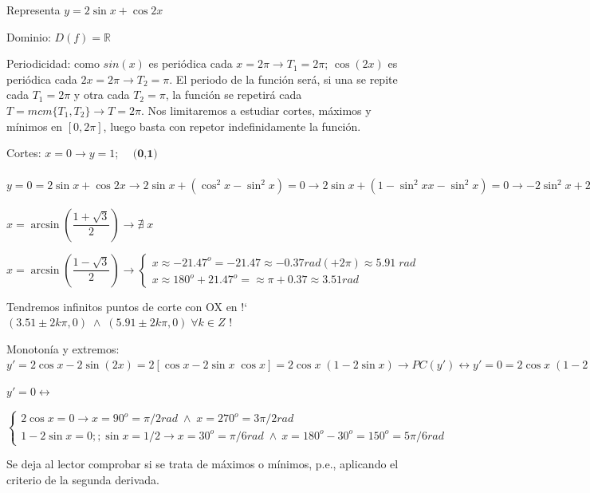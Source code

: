 \begin{ejre} Representa $y=2 \sin x + \cos 2x$
	
\end{ejre}

\begin{proofw}\renewcommand{\qedsymbol}{$\diamond$}	

Dominio: $D(f)=\mathbb R$

Periodicidad: como $sin (x)$ es periódica cada $x=2\pi \to T_1=2\pi$; $\cos(2x)$ es periódica cada $2x=2\pi \to T_2=\pi$. El periodo de la función será, si una se repite cada  $T_1=2\pi$ y otra cada $T_2=\pi$, la función se repetirá cada $T=mcm\{T_1, T_2\} \to T=2\pi$. Nos limitaremos a estudiar cortes, máximos y mínimos en $[0,2\pi]$, luego basta con repetor indefinidamente la función.

Cortes: $x=0 \to y=1$; $\quad \textbf{(0,1)}$

$y=0=2 \sin x + \cos 2x \to 2\sin x + (\cos^2 x-\sin^2 x)=0 \to  2\sin x + (1-\sin^2 x x-\sin^2 x)=0 \to -2\sin^2 x +2\sin x +1 =0 \to \sin x = \dfrac {1 \pm \sqrt{3}}{2} $

$x=\arcsin \left(\dfrac {1 + \sqrt{3} } {2} \right) \to \nexists \; x$

$x=\arcsin \left(\dfrac {1 - \sqrt{3} } {2} \right) \to  
\begin{cases}
	x \approx -21.47^o = -21.47  \approx -0.37  rad (+2\pi) \approx 5.91\; rad \\
	x \approx 180^o +21.47^o = \approx \pi+0.37 \approx 3.51 rad 
\end{cases}$


 Tendremos infinitos puntos de corte con OX en  !` $(3.51 \pm 2k\pi,0)\;\wedge \;(5.91 \pm 2k\pi,0)\; \forall k \in Z$ !

Monotonía y extremos: $y'=2\cos x -2\sin (2x)= 2[\cos x - 2 \sin x \; \cos x] = 2 \cos x \; (1-2\sin x) \to PC(y') \leftrightarrow y'=0= 2 \cos x \; (1-2\sin x) \to $

$y'=0 \leftrightarrow $

\noindent \footnotesize{$\begin{cases}{2}
\cos x=0 \to x=90^o = \pi/2 rad \; \wedge \; x= 270^o = 3\pi /2 rad \\
1-2\sin x=0;; \sin x=1/2 \to x=30^o =\pi /6 rad \; \wedge \ x=180^o-30^o = 150^o = 5\pi/6 rad	
\end{cases}$}

\normalsize{Se} deja al lector comprobar si se trata de máximos o mínimos, p.e., aplicando el criterio de la segunda derivada.


\end{proofw}
